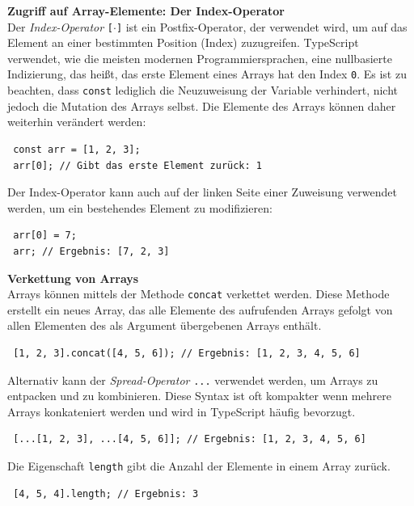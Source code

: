 \textbf{Zugriff auf Array-Elemente: Der Index-Operator}\\
Der \textit{Index-Operator} \texttt{[\(\cdot\)]} ist ein Postfix-Operator, der verwendet wird, um auf das Element an einer bestimmten Position (Index) zuzugreifen. TypeScript verwendet, wie die meisten modernen Programmiersprachen, eine nullbasierte Indizierung, das heißt, das erste Element eines Arrays hat den Index \texttt{0}. Es ist zu beachten, dass \texttt{const} lediglich die Neuzuweisung der Variable verhindert, nicht jedoch die Mutation des Arrays selbst. Die Elemente des Arrays können daher weiterhin verändert werden:

\begin{verbatim}
 const arr = [1, 2, 3];
 arr[0]; // Gibt das erste Element zurück: 1
\end{verbatim}

Der Index-Operator kann auch auf der linken Seite einer Zuweisung verwendet werden, um ein bestehendes Element zu modifizieren:
\begin{verbatim}
 arr[0] = 7;
 arr; // Ergebnis: [7, 2, 3]
\end{verbatim}

\textbf{Verkettung von Arrays}\\
Arrays können mittels der Methode \texttt{concat} verkettet werden. Diese Methode erstellt ein neues Array, das alle Elemente des aufrufenden Arrays gefolgt von allen Elementen des als Argument übergebenen Arrays enthält.
\begin{verbatim}
 [1, 2, 3].concat([4, 5, 6]); // Ergebnis: [1, 2, 3, 4, 5, 6]
\end{verbatim}

Alternativ kann der \textit{Spread-Operator} \texttt{...} verwendet werden, um Arrays zu entpacken und zu kombinieren. Diese Syntax ist oft kompakter wenn mehrere Arrays konkateniert werden und wird in TypeScript häufig bevorzugt.
\begin{verbatim}
 [...[1, 2, 3], ...[4, 5, 6]]; // Ergebnis: [1, 2, 3, 4, 5, 6]
\end{verbatim}

Die Eigenschaft \texttt{length} gibt die Anzahl der Elemente in einem Array zurück.
\begin{verbatim}
 [4, 5, 4].length; // Ergebnis: 3
\end{verbatim}

